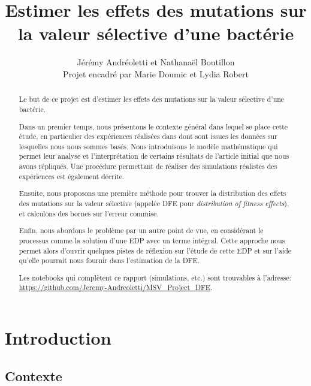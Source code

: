 \documentclass[12pt]{article}
\title{Estimer les effets des mutations sur la valeur sélective d'une bactérie}
\author{Jérémy Andréoletti et Nathanaël Boutillon\\Projet encadré par Marie Doumic et Lydia Robert}
\newcounter{prop}[section]
\begin{document}
\maketitle

\begin{abstract}
  Le but de ce projet est d'estimer les effets des mutations sur la valeur sélective d'une bactérie.

  Dans un premier temps, nous présentons le contexte général dans lequel se place cette étude, en particulier des expériences réalisées dans \cite{rob} dont sont issues les données sur lesquelles nous nous sommes basés. Nous introduisons le modèle mathématique qui permet leur analyse et l'interprétation de certains résultats de l'article initial que nous avons répliqués. Une procédure permettant de réaliser des simulations réalistes des expériences est également décrite.

  Ensuite, nous proposons une première méthode pour trouver la distribution des effets des mutations sur la valeur sélective (appelée DFE pour \emph{distribution of fitness effects}), et calculons des bornes sur l'erreur commise.

  Enfin, nous abordons le problème par un autre point de vue, en considérant le processus comme la solution d'une EDP avec un terme intégral. Cette approche nous permet alors d'ouvrir quelques pistes de réflexion sur l'étude de cette EDP et sur l'aide qu'elle pourrait nous fournir dans l'estimation de la DFE.

  Les notebooks qui complètent ce rapport (simulations, etc.) sont trouvables à l'adresse: \url{https://github.com/Jeremy-Andreoletti/MSV_Project_DFE}.

\end{abstract}

\newpage

\tableofcontents

\newpage

\FloatBarrier
\section{Introduction}

\subsection{Contexte}
\end{document}
